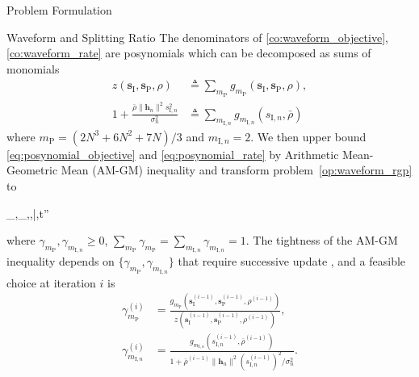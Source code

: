 \documentclass[journal]{IEEEtran}
\begin{document}
\begin{section}{Problem Formulation}
\begin{subsection}{Waveform and Splitting Ratio}
			The denominators of \eqref{co:waveform_objective}, \eqref{co:waveform_rate} are posynomials \cite{Boyd2007} which can be decomposed as sums of monomials
			\begin{align}
				z(\boldsymbol{s}_{\mathrm{I}},\boldsymbol{s}_\mathrm{P},\rho) &\triangleq \sum_{m_\mathrm{P}}{g_{m_\mathrm{P}}(\boldsymbol{s}_{\mathrm{I}},\boldsymbol{s}_\mathrm{P},\rho)}\label{eq:posynomial_objective},\\
				1+\frac{\bar{\rho}\lVert{\boldsymbol{h}_n}\rVert^2 s_{\mathrm{I},n}^2}{\sigma_n^2} &\triangleq \sum_{m_{\mathrm{I},n}}g_{m_{\mathrm{I},n}}(s_{\mathrm{I},n},\bar{\rho})\label{eq:posynomial_rate}
			\end{align}
			where $m_\mathrm{P}=(2N^3+6N^2+7N)/3$ and $m_{\mathrm{I},n}=2$. We then upper bound \eqref{eq:posynomial_objective} and \eqref{eq:posynomial_rate} by Arithmetic Mean-Geometric Mean (AM-GM) inequality \cite{Chiang2005} and transform problem~\eqref{op:waveform_rgp} to
			\begin{mini!}
				{_{},_,\rho,\bar{\rho},t''}{}{\label{op:waveform_gp}}{}
			\end{mini!}
			where $\gamma_{m_\mathrm{P}},\gamma_{m_{\mathrm{I},n}} \ge 0$, $\sum_{m_\mathrm{P}}\gamma_{m_\mathrm{P}}=\sum_{m_{\mathrm{I},n}}\gamma_{m_{\mathrm{I},n}}=1$. The tightness of the AM-GM inequality depends on $\{\gamma_{m_\mathrm{P}},\gamma_{m_{\mathrm{I},n}}\}$ that require successive update \cite{Clerckx2018b}, and a feasible choice at iteration $i$ is
			\begin{align}
				\gamma_{m_\mathrm{P}}^{(i)} & = \frac{g_{m_\mathrm{P}}(\boldsymbol{s}_{\mathrm{I}}^{(i-1)},\boldsymbol{s}_\mathrm{P}^{(i-1)},\rho^{(i-1)})}{z(\boldsymbol{s}_{\mathrm{I}}^{(i-1)},\boldsymbol{s}_\mathrm{P}^{(i-1)},\rho^{(i-1)})}\label{eq:gamma_P},\\
				\gamma_{m_{\mathrm{I},n}}^{(i)} & = \frac{g_{m_{\mathrm{I},n}}(s_{\mathrm{I},n}^{(i-1)},\bar{\rho}^{(i-1)})}{1+{\bar{\rho}^{(i-1)}\lVert{\boldsymbol{h}_n}\rVert^2 (s_{\mathrm{I},n}^{(i-1)})^2}\big/{\sigma_n^2}}.\label{eq:gamma_I}
			\end{align}


\end{subsection}
\end{section}
\end{document}
